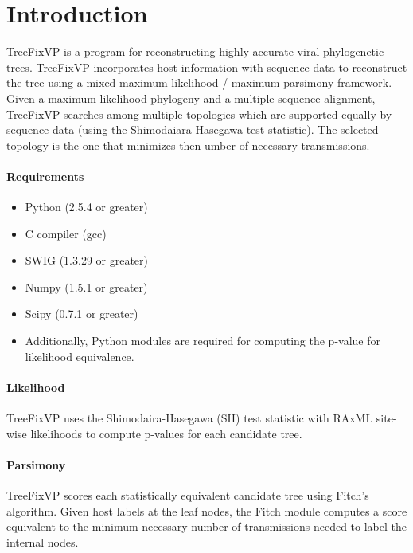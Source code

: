 \documentclass[12pt]{article}
\begin{document}
\maketitle

\section{Introduction}
TreeFixVP is a program for reconstructing highly accurate viral phylogenetic trees.
TreeFixVP incorporates host information with sequence data to reconstruct the tree using 
a mixed maximum likelihood / maximum parsimony framework. Given a maximum likelihood phylogeny
and a multiple sequence alignment, TreeFixVP searches among multiple topologies which are supported
equally by sequence data (using the Shimodaiara-Hasegawa test statistic). The selected topology
is the one that minimizes then umber of necessary transmissions.

\paragraph{Requirements}
    \begin{itemize}
        \item Python (2.5.4 or greater)
        \item C compiler (gcc)
        \item SWIG (1.3.29 or greater)
        \item Numpy (1.5.1 or greater)
        \item Scipy (0.7.1 or greater)
        \item Additionally, Python modules are required for computing the p-value for likelihood equivalence.
    \end{itemize}

\paragraph{Likelihood}
TreeFixVP uses the Shimodaira-Hasegawa (SH) test statistic with RAxML site-wise likelihoods to compute
p-values for each candidate tree.

\paragraph{Parsimony}
TreeFixVP scores each statistically equivalent candidate tree using Fitch's algorithm.
Given host labels at the leaf nodes, the Fitch module computes a score equivalent to the
minimum necessary number of transmissions needed to label the internal nodes.
\end{document}
